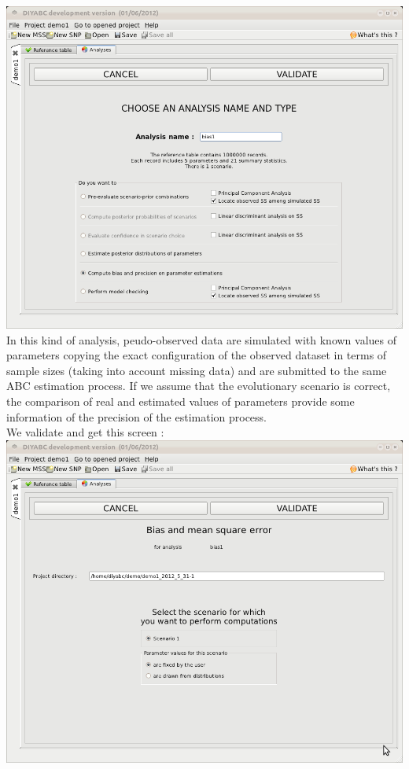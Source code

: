 \includegraphics[scale=0.35]{gui_pictures/Capture-DIYABC-43.png} \\

In this kind of analysis, peudo-observed data are simulated with known values of parameters copying the exact configuration of the observed dataset in terms of sample sizes (taking into account missing data) and are submitted to the same ABC estimation process. If we assume that the evolutionary scenario is correct, the comparison of real and estimated values of parameters provide some information of the precision of the estimation process.\\  
We validate and get this screen :\\

\includegraphics[scale=0.35]{gui_pictures/Capture-DIYABC-44.png} \\

